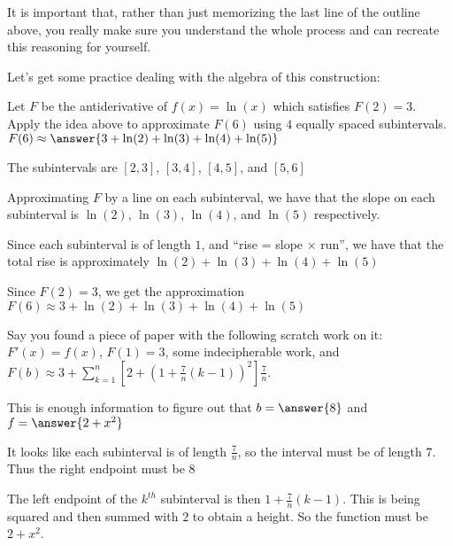 \documentclass{ximera}
\begin{document}
	It is important that, rather than just memorizing the last line of the outline above, you really make sure you understand the whole process and can recreate this reasoning for yourself.  
	
	Let's get some practice dealing with the algebra of this construction:
	
	\begin{question}
		Let $F$ be the antiderivative of $f(x) = \ln(x)$ which satisfies $F(2) = 3$.  Apply the idea above to approximate $F(6)$ using $4$ equally spaced subintervals.  $F(6) \approx \answer{3+ \ln(2) + \ln(3) + \ln(4) + \ln(5)}$
		\begin{hint}
			The subintervals are $[2,3]$, $[3,4]$, $[4,5]$, and $[5,6]$
		\end{hint}
		\begin{hint}
			Approximating $F$ by a line on each subinterval, we have that the slope on each subinterval is $\ln(2)$, $\ln(3)$, $\ln(4)$,  and $\ln(5)$ respectively.
		\end{hint}
		\begin{hint}
			Since each subinterval is of length $1$, and ``rise = slope $\times$ run'', we have that the total rise is approximately $\ln(2) + \ln(3) + \ln(4) + \ln(5)$ 
		\end{hint}
		\begin{hint}
			Since $F(2) = 3$, we get the approximation $F(6) \approx 3+ \ln(2) + \ln(3) + \ln(4) + \ln(5)$
		\end{hint}
	\end{question}
	
	\begin{question}
		Say you found a piece of paper with the following scratch work on it: $F'(x) =f(x)$,  $F(1) = 3$, some indecipherable work, and $F(b) \approx 3 + \sum_{k=1}^{n} \left[2+ ( 1+ \frac{7}{n}(k-1))^2 \right ] \frac{7}{n}$.
		
		This is enough information to figure out that $b = \answer{8}$   and $f = \answer{2+x^2}$
		\begin{hint}
			It looks like each subinterval is of length $\frac{7}{n}$, so the interval must be of length $7$.  Thus the right endpoint must be $8$
		\end{hint}
		\begin{hint}
			The left endpoint of the $k^{th}$ subinterval is then $1+ \frac{7}{n}(k-1)$.  This is being squared and then summed with $2$ to obtain a height.  So the function must be $2+x^2$.
		\end{hint}
	\end{question}
	
\end{document}
